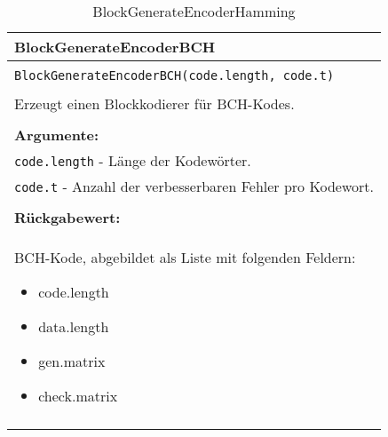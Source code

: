 \begin{longtable}{|p{\textwidth}|}
\hline
\rowcolor{lightblue}
BlockGenerateEncoderBCH
\\
\hline
\\
\texttt{BlockGenerateEncoderBCH(code.length, code.t)}\\
\\
Erzeugt einen Blockkodierer für BCH-Kodes.\\
\\
\textbf{Argumente:}\\
\texttt{code.length} - Länge der Kodewörter.\\
\texttt{code.t} - Anzahl der verbesserbaren Fehler pro Kodewort.\\
\\
\textbf{Rückgabewert:}\\
BCH-Kode, abgebildet als Liste mit folgenden Feldern:
\vspace{4mm}
\begin{itemize}
\renewcommand\labelitemi{--}
\itemsep-.5em %
\item code.length
\item data.length
\item gen.matrix
\item check.matrix
\end{itemize}
\\
\hline
\caption{BlockGenerateEncoderHamming}
\end{longtable}